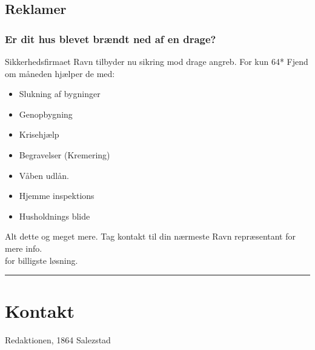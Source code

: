 \documentclass[letterpaper,12pt]{memoir}
\newcommand{\separator}{\par\noindent\color{black!40}\rule{\textwidth}{0.4pt}\par}
\begin{document}
\newpage
\subsection*{Reklamer}
\subsubsection*{Er dit hus blevet brændt ned af en drage?}
Sikkerhedsfirmaet Ravn tilbyder nu sikring mod drage angreb. For kun 64* Fjend om måneden hjælper de med:
\begin{itemize}
  \item Slukning af bygninger
  \item Genopbygning
  \item Krisehjælp
  \item Begravelser (Kremering)
  \item Våben udlån.
  \item Hjemme inspektions
  \item Husholdnings blide
\end{itemize}
Alt dette og meget mere. Tag kontakt til din nærmeste Ravn repræsentant for mere info.\\
{\small*for billigste løsning.}





\separator

\section*{Kontakt}
Redaktionen, 1864 Salezstad
\end{document}
